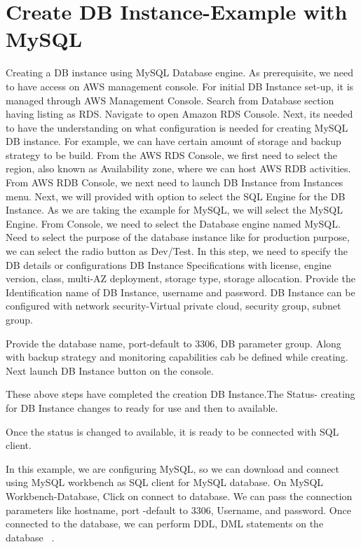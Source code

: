 \section{Create DB Instance-Example with MySQL}
Creating a DB instance using MySQL Database engine.
As prerequisite, we need to have access on AWS management console.
For initial DB Instance set-up, it is managed through AWS Management
Console.
Search from Database section having listing as RDS.
Navigate to open Amazon RDS Console.
Next, its needed to have the understanding on what configuration is needed 
for creating MySQL DB instance. For example, we can have certain amount of 
storage and backup strategy to be build.
From the AWS RDS Console, we first need to select the region, also 
known as Availability zone, where we can host AWS RDB activities.
From AWS RDB Console, we next need to launch DB Instance from 
Instances menu.
Next, we will provided with option to select the SQL Engine for the DB 
Instance. As we are taking the example for MySQL, we will select the 
MySQL Engine.
From Console, we need to select the Database engine named MySQL.
Need to select the purpose of the database instance like for 
production purpose, we can select the radio button as Dev/Test.
In this step, we need to specify the DB details or configurations
DB Instance Specifications with license, engine version, class, multi-AZ 
deployment, storage type, storage allocation.
Provide the Identification name of DB Instance, username and password.
DB Instance can be configured with network security-Virtual private 
cloud, security group, subnet group.

Provide the database name, port-default to 3306, DB parameter group. 
Along with backup strategy and monitoring capabilities cab be defined 
while creating.
Next launch DB Instance button on the console.

These above steps have completed the creation DB Instance.The Status- 
creating for DB Instance changes to ready for use and then to available.

Once the status is changed to available, it is ready to be connected 
with SQL client.

In this example, we are configuring MySQL, so we can download and connect 
using MySQL workbench as SQL client for MySQL database. 
On MySQL Workbench-Database, Click on connect to database. We 
can pass the connection parameters like hostname, port -default to 3306, 
Username, and password.
Once connected to the database, we can perform DDL, DML 
statements on the database
~\cite{hid-sp18-520-amazonrdscreatesteps}.

